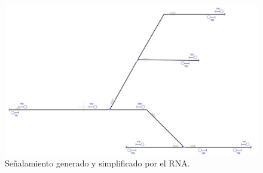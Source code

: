     \begin{figure}[h]
        \centering
        \includegraphics[width=1\textwidth]{resultados-obtenidos/ejemplo7/images/7_RNA.png}
        \centering\caption{Señalamiento generado y simplificado por el RNA.}
    \end{figure}
    
    
    
    
    